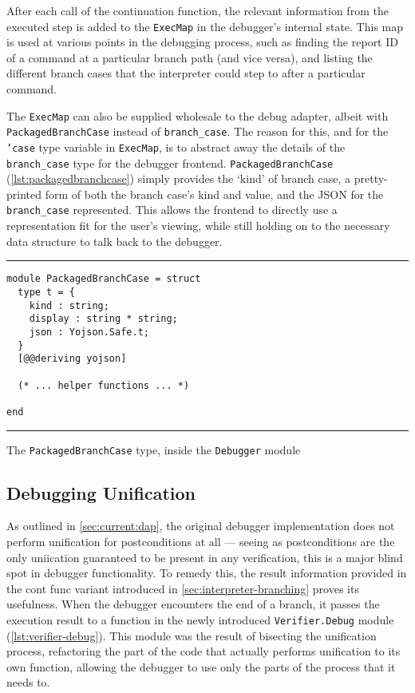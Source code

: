 After each call of the continuation function, the relevant information from
the executed step is added to the \texttt{ExecMap} in the debugger's internal
state. This map is used at various points in the debugging process, such as
finding the report ID of a command at a particular branch path (and vice versa),
and listing the different branch cases that the interpreter could step to after
a particular command.

The \texttt{ExecMap} can also be supplied wholesale to the debug adapter,
albeit with \texttt{PackagedBranchCase} instead of \texttt{branch\_case}.
The reason for this, and for the \texttt{'case} type variable in
\texttt{ExecMap}, is to abstract away the details of the \texttt{branch\_case}
type for the debugger frontend. \texttt{PackagedBranchCase}
(\autoref{lst:packagedbranchcase}) simply provides the `kind' of branch case,
a pretty-printed form of both the branch case's kind and value, and the JSON
for the \texttt{branch\_case} represented. This allows the frontend to directly
use a representation fit for the user's viewing, while still holding on to the
necessary data structure to talk back to the debugger.

\begin{listing}[!ht]
\noindent\rule{\textwidth}{0.5pt}
\vspace{-0.6cm}
\begin{verbatim}
module PackagedBranchCase = struct
  type t = {
    kind : string;
    display : string * string;
    json : Yojson.Safe.t;
  }
  [@@deriving yojson]

  (* ... helper functions ... *)

end
\end{verbatim}
\vspace{-0.4cm}
\noindent\rule{\textwidth}{0.5pt}
\vspace{-0.6cm}
\caption{The \texttt{PackagedBranchCase} type, inside the \texttt{Debugger} module}
\label{lst:packagedbranchcase}
\end{listing}


\subsection{Debugging Unification}

As outlined in \autoref{sec:current:dap}, the original debugger implementation
does not perform unification for postconditions at all --- seeing as
postconditions are the only uniication guaranteed to be present in any
verification, this is a major blind spot in debugger functionality. To remedy
this, the result information provided in the \texttt{} cont func variant
introduced in \autoref{sec:interpreter-branching} proves its usefulness.
When the debugger encounters the end of a branch, it passes the execution
result to a function in the newly introduced \texttt{Verifier.Debug} module
(\autoref{lst:verifier-debug}). This module was the result of bisecting the
unification process, refactoring the part of the code that actually performs
unification to its own function, allowing the debugger to use only the parts
of the process that it needs to.

